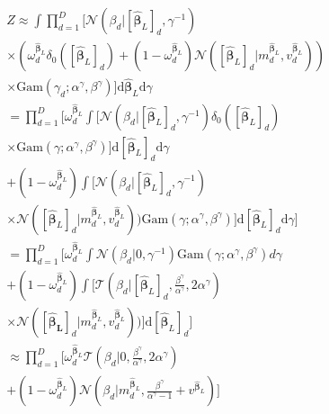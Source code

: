 \documentclass[letterpaper]{article}
\begin{document}
\begin{align}
&Z \approx \int \prod_{d=1}^{D} \big[\mathcal{N}(\beta_d | [\widehat{\boldsymbol\beta}_L]_d, \gamma^{-1}) \nonumber \\
&\times (\omega^{\widehat{\boldsymbol\beta}_L}_d \delta_0([\widehat{\boldsymbol\beta}_L]_d) + (1 - \omega^{\widehat{\boldsymbol\beta}_L}_d)\mathcal{N}([\widehat{\boldsymbol\beta}_L]_d | m^{\widehat{\boldsymbol\beta}_L}_d, v^{\widehat{\boldsymbol\beta}_L}_d)) \nonumber\\
&\times \text{Gam} (\gamma_d; \alpha^\gamma, \beta^\gamma)\big]\mathrm{d}\widehat{\boldsymbol\beta}_L \mathrm{d}\gamma  \nonumber\\
&= \prod_{d=1}^{D} \Big[\omega^{\widehat{\boldsymbol\beta}_L}_d \int \big[\mathcal{N}(\beta_d | [\widehat{\boldsymbol\beta}_L]_d, \gamma^{-1})  \delta_0([\widehat{\boldsymbol\beta}_L]_d) \nonumber \\
&\times \text{Gam} (\gamma; \alpha^\gamma, \beta^\gamma)\big]\mathrm{d}[\widehat{\boldsymbol\beta}_L]_d \mathrm{d}\gamma  \nonumber\\
& + (1 - \omega^{\widehat{\boldsymbol\beta}_L}_d)\int \big[\mathcal{N}(\beta_d | [\widehat{\boldsymbol\beta}_L]_d, \gamma^{-1})\nonumber\\
&\times \mathcal{N}([\widehat{\boldsymbol\beta}_L]_d | m^{\widehat{\boldsymbol\beta}_L}_d, v^{\widehat{\boldsymbol\beta}_L}_d)) \text{Gam} (\gamma; \alpha^\gamma, \beta^\gamma)\big]\mathrm{d}[\widehat{\boldsymbol\beta}_L]_d \mathrm{d}\gamma\Big]  \nonumber\\
& = \prod_{d=1}^{D} \Big[\omega^{\widehat{\boldsymbol\beta}_L}_d \int \mathcal{N}(\beta_d | 0, \gamma^{-1})  \text{Gam} (\gamma; \alpha^\gamma, \beta^\gamma) d\gamma  \nonumber\\
& + (1 - \omega^{\widehat{\boldsymbol\beta}_L}_d)\int \big[\mathcal{T}(\beta_d | [\widehat{\boldsymbol\beta}_L]_d, \frac{\beta^\gamma}{\alpha^\gamma}, 2\alpha^\gamma)  \nonumber\\
&\times \mathcal{N}([\mathbf{\widehat{\boldsymbol\beta}_L}]_d| m^{\widehat{\boldsymbol\beta}_L}_d, v^{\widehat{\boldsymbol\beta}_L}_d))\big] \mathrm{d}[\widehat{\boldsymbol\beta}_L]_d\Big]  \nonumber\\
& \approx \prod_{d=1}^D \Big[\omega^{\widehat{\boldsymbol\beta}_L}_d  \mathcal{T}(\beta_d | 0, \frac{\beta^\gamma}{\alpha^\gamma}, 2\alpha^\gamma) \nonumber \\ 
\label{eq:Z_approx}
&+ (1 - \omega^{\widehat{\boldsymbol\beta}_L}_d)\mathcal{N}(\beta_d | m^{\widehat{\boldsymbol\beta}_L}_d, \frac{\beta^\gamma}{\alpha^\gamma - 1} + v^{\widehat{\boldsymbol\beta}_L})\Big]
\end{align}
\end{document}
